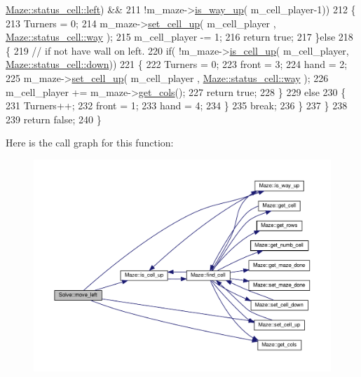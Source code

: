 \begin{DoxyCode}
      \hyperlink{classMaze_a07167e321eac2b67100fb82ecb98f1d1a811882fecd5c7618d7099ebbd39ea254}{Maze::status\_cell::left}) &&
211                     !m\_maze->\hyperlink{classMaze_a308fa695665de6217c0e7f28aab5adda}{is\_way\_up}( m\_cell\_player-1))
212             \{
213                 Turners = 0;
214                 m\_maze->\hyperlink{classMaze_aa7c832a91a3db8f48b31f688332f8986}{set\_cell\_up}( m\_cell\_player , 
      \hyperlink{classMaze_a07167e321eac2b67100fb82ecb98f1d1ac83b72dd001482ce10f0b106c7a0ed0e}{Maze::status\_cell::way} );
215                 m\_cell\_player -= 1;
216                 \textcolor{keywordflow}{return} \textcolor{keyword}{true};
217             \}\textcolor{keywordflow}{else}
218             \{
219                 \textcolor{comment}{// if not have wall on left.}
220                 \textcolor{keywordflow}{if}( !m\_maze->\hyperlink{classMaze_a2b0e69e72d6c3e1037578f057946a21e}{is\_cell\_up}( m\_cell\_player, 
      \hyperlink{classMaze_a07167e321eac2b67100fb82ecb98f1d1a74e8333ad11685ff3bdae589c8f6e34d}{Maze::status\_cell::down}))
221                 \{
222                     Turners = 0;
223                     front = 3;
224                     hand = 2;
225                     m\_maze->\hyperlink{classMaze_aa7c832a91a3db8f48b31f688332f8986}{set\_cell\_up}( m\_cell\_player , 
      \hyperlink{classMaze_a07167e321eac2b67100fb82ecb98f1d1ac83b72dd001482ce10f0b106c7a0ed0e}{Maze::status\_cell::way} );
226                     m\_cell\_player += m\_maze->\hyperlink{classMaze_a8a04cd1335e96a80358181afa164d4c9}{get\_cols}();
227                     \textcolor{keywordflow}{return} \textcolor{keyword}{true};
228                 \}
229                 \textcolor{keywordflow}{else}
230                 \{
231                     Turners++;
232                     front = 1;
233                     hand = 4;
234                 \}
235                 \textcolor{keywordflow}{break};
236             \}
237     \}
238 
239     \textcolor{keywordflow}{return} \textcolor{keyword}{false};
240 \}
\end{DoxyCode}
Here is the call graph for this function\+:\nopagebreak
\begin{figure}[H]
\begin{center}
\leavevmode
\includegraphics[width=350pt]{classSolve_a8226032eb1d4877539f417d4fab0efde_cgraph}
\end{center}
\end{figure}
